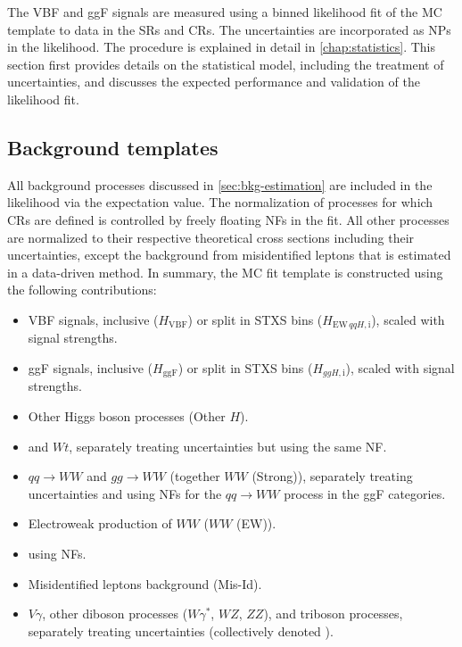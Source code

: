 
The VBF and ggF signals are measured using a binned likelihood fit of the MC template to data in the SRs and CRs. The uncertainties are incorporated as NPs in the likelihood. The procedure is explained in detail in \cref{chap:statistics}. 
This section first provides details on the statistical model, including the treatment of uncertainties, and discusses the expected performance and validation of the likelihood fit.


\subsection{Background templates}
All background processes discussed in \cref{sec:bkg-estimation} are included in the likelihood via the expectation value. 
The normalization of processes for which CRs are defined is controlled by freely floating NFs in the fit. All other processes are normalized to their respective theoretical cross sections including their uncertainties, except the background from misidentified leptons that is estimated in a data-driven method.
In summary, the MC fit template is constructed using the following contributions:
\begin{itemize}
    \item VBF signals, inclusive ($H_{\mathrm{VBF}}$) or split in STXS bins ($H_{\mathrm{EW\,} qqH\mathrm{, i}}$), scaled with signal strengths.
    \item ggF signals, inclusive ($H_{\mathrm{ggF}}$) or split in STXS bins ($H_{ggH\mathrm{, i}}$), scaled with signal strengths.
    \item Other Higgs boson processes (Other $H$).
    \item \ttbar and $Wt$, separately treating uncertainties but using the same NF.
    \item $qq \to WW$ and $gg \to WW$ (together $WW$ (Strong)), separately treating uncertainties and using NFs for the $qq \to WW$ process in the ggF categories.
    \item Electroweak production of $WW$ ($WW$ (EW)).
    \item \Zgamma using NFs.
    \item Misidentified leptons background (Mis-Id).
    \item $V\gamma$, other diboson processes ($W\gamma^*$, $WZ$, $ZZ$), and triboson processes, separately treating uncertainties (collectively denoted \OtherVVV).
\end{itemize}

